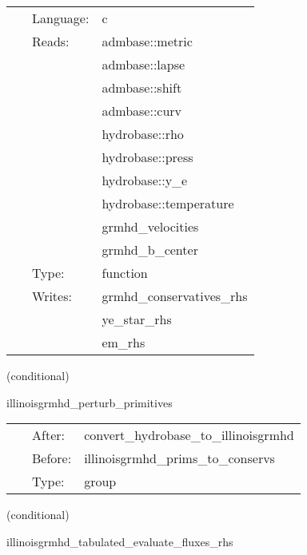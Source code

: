  \begin{tabular*}{160mm}{cll} 
~ & Language:  & c \\ 
~ & Reads:  & admbase::metric \\ 
~& ~ &admbase::lapse\\ 
~& ~ &admbase::shift\\ 
~& ~ &admbase::curv\\ 
~& ~ &hydrobase::rho\\ 
~& ~ &hydrobase::press\\ 
~& ~ &hydrobase::y\_e\\ 
~& ~ &hydrobase::temperature\\ 
~& ~ &grmhd\_velocities\\ 
~& ~ &grmhd\_b\_center\\ 
~ & Type:  & function \\ 
~ & Writes:  & grmhd\_conservatives\_rhs \\ 
~& ~ &ye\_star\_rhs\\ 
~& ~ &em\_rhs\\ 
\end{tabular*} 


\vspace{5mm}

   (conditional) 

\hspace{5mm} illinoisgrmhd\_perturb\_primitives 

\hspace{5mm}{\it perturb initial primitive data } 


\hspace{5mm}

 \begin{tabular*}{160mm}{cll} 
~ & After:  & convert\_hydrobase\_to\_illinoisgrmhd \\ 
~ & Before:  & illinoisgrmhd\_prims\_to\_conservs \\ 
~ & Type:  & group \\ 
\end{tabular*} 


\vspace{5mm}

   (conditional) 

\hspace{5mm} illinoisgrmhd\_tabulated\_evaluate\_fluxes\_rhs 

\hspace{5mm}{\it tabulated version of illinoisgrmhd\_evaluate\_fluxes\_rhs } 


